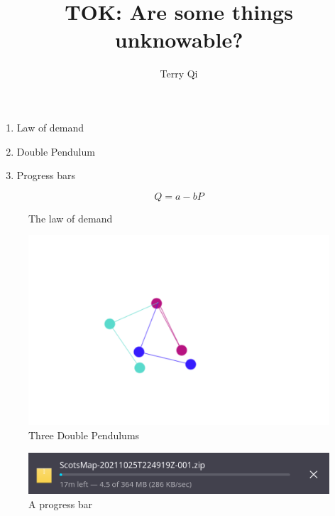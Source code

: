 \documentclass[a4paper,12pt]{article}
\title{TOK: Are some things unknowable?}
\author{Terry Qi}
\begin{document}
\maketitle
\begin{enumerate}
 \item Law of demand
 \item Double Pendulum
 \item Progress bars
\end{enumerate}

\begin{figure}[h!]
 \centering
 \[
    Q = a - bP
 \]
 \caption{The law of demand}
\end{figure}

\begin{figure}[h!]
 \centering
 \includegraphics[scale=0.25]{dpend.png}
 \caption{Three Double Pendulums}
\end{figure}

\begin{figure}[h!]
 \centering
 \includegraphics[scale=0.35]{progress.png}
 \caption{A progress bar}
\end{figure}



\newpage

\end{document}
